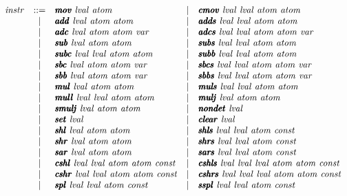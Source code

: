 \documentclass{article}
\begin{document}
\[
\begin{array}{rclcl}
  \instr &  ::= & \pmb\imov\ \lval\ \atom
         & \mid & \pmb\icmov\ \lval\ \lval\ \atom\ \atom \\
         & \mid & \pmb\iadd\ \lval\ \atom\ \atom
         & \mid & \pmb\iadds\ \lval\ \lval\ \atom\ \atom \\
         & \mid & \pmb\iadc\ \lval\ \atom\ \atom\ \var
         & \mid & \pmb\iadcs\ \lval\ \lval\ \atom\ \atom\ \var \\
         & \mid & \pmb\isub\ \lval\ \atom\ \atom 
         & \mid & \pmb\isubs\ \lval\ \lval\ \atom\ \atom \\
         & \mid & \pmb\isubc\ \lval\ \lval\ \atom\ \atom
         & \mid & \pmb\isubb\ \lval\ \lval\ \atom\ \atom \\
         & \mid & \pmb\isbc\ \lval\ \atom\ \atom\ \var
         & \mid & \pmb\isbcs\ \lval\ \lval\ \atom\ \atom\ \var \\
         & \mid & \pmb\isbb\ \lval\ \atom\ \atom\ \var
         & \mid & \pmb\isbbs\ \lval\ \lval\ \atom\ \atom\ \var \\
         & \mid & \pmb\imul\ \lval\ \atom\ \atom
         & \mid & \pmb\imuls\ \lval\ \lval\ \atom\ \atom \\
         & \mid & \pmb\imull\ \lval\ \lval\ \atom\ \atom
         & \mid & \pmb\imulj\ \lval\ \atom\ \atom \\
         & \mid & \pmb\ismulj\ \lval\ \atom\ \atom
         & \mid & \pmb\inondet\ \lval \\
         & \mid & \pmb\iset\ \lval
         & \mid & \pmb\iclear\ \lval \\
         & \mid & \pmb\ishl\ \lval\ \atom\ \atom
         & \mid & \pmb\ishls\ \lval\ \lval\ \atom\ \const \\
         & \mid & \pmb\ishr\ \lval\ \atom\ \atom
         & \mid & \pmb\ishrs\ \lval\ \lval\ \atom\ \const \\
         & \mid & \pmb\isar\ \lval\ \atom\ \atom
         & \mid & \pmb\isars\ \lval\ \lval\ \atom\ \const \\
         & \mid & \pmb\icshl\ \lval\ \lval\ \atom\ \atom\ \const
         & \mid & \pmb\icshls\ \lval\ \lval\ \lval\ \atom\ \atom\ \const \\
         & \mid & \pmb\icshr\ \lval\ \lval\ \atom\ \atom\ \const
         & \mid & \pmb\icshrs\ \lval\ \lval\ \lval\ \atom\ \atom\ \const \\
         & \mid & \pmb\ispl\ \lval\ \lval\ \atom\ \const
         & \mid & \pmb\isspl\ \lval\ \lval\ \atom\ \const \\

\end{array}\]
\end{document}
